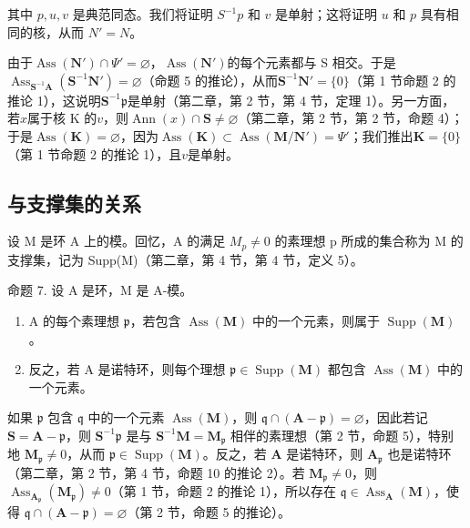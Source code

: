 其中 \(p, u, v\) 是典范同态。我们将证明 \(S^{-1}p\) 和 \(v\) 是单射；这将证明 \(u\) 和 \(p\) 具有相同的核，从而 \(N' = N\)。

由于\(\operatorname{Ass}(\mathbf{N}') \cap \Psi' = \varnothing\)，\(\operatorname{Ass}(\mathbf{N}')\)的每个元素都与 S 相交。于是\(\operatorname{Ass}_{\mathbf{S}^{-1}\mathbf{A}}(\mathbf{S}^{-1}\mathbf{N}') = \varnothing\)（命题 5 的推论），从而\(\mathbf{S}^{-1}\mathbf{N}' = \{0\}\)（第 1 节命题 2 的推论 1），这说明\(\mathbf{S}^{-1}\mathfrak{p}\)是单射（第二章，第 2 节，第 4 节，定理 1）。另一方面，若\(x\)属于核 K 的\(v\)，则\(\operatorname{Ann}(x) \cap \mathbf{S} \neq \varnothing\)（第二章，第 2 节，第 2 节，命题 4）；于是\(\operatorname{Ass}(\mathbf{K}) = \varnothing\)，因为\(\operatorname{Ass}(\mathbf{K}) \subset \operatorname{Ass}(\mathbf{M}/\mathbf{N}') = \Psi'\)；我们推出\(\mathbf{K} = \{0\}\)（第 1 节命题 2 的推论 1），且\(v\)是单射。

\subsection{与支撑集的关系}

设 M 是环 A 上的模。回忆，A 的满足 \(M_{p} \neq 0\) 的素理想 p 所成的集合称为 M 的支撑集，记为 Supp(M)（第二章，第 4 节，第 4 节，定义 5）。

命题 7. 设 A 是环，M 是 A-模。

\begin{enumerate}
\def\labelenumi{(\roman{enumi})}
\item
A 的每个素理想 \(\mathfrak{p}\)，若包含 \(\operatorname{Ass}(\mathbf{M})\) 中的一个元素，则属于 \(\operatorname{Supp}(\mathbf{M})\)。
\item
反之，若 A 是诺特环，则每个理想 \(\mathfrak{p} \in \operatorname{Supp}(\mathbf{M})\) 都包含 \(\operatorname{Ass}(\mathbf{M})\) 中的一个元素。
\end{enumerate}

如果 \(\mathfrak{p}\) 包含 \(\mathfrak{q}\) 中的一个元素 \(\operatorname{Ass}(\mathbf{M})\)，则 \(\mathfrak{q} \cap (\mathbf{A} - \mathfrak{p}) = \varnothing\)，因此若记 \(\mathbf{S} = \mathbf{A} - \mathfrak{p}\)，则 \(\mathbf{S}^{-1}\mathfrak{p}\) 是与 \(\mathbf{S}^{-1}\mathbf{M} = \mathbf{M}_{\mathfrak{p}}\) 相伴的素理想（第 2 节，命题 5），特别地 \(\mathbf{M}_{\mathfrak{p}} \neq 0\)，从而 \(\mathfrak{p} \in \operatorname{Supp}(\mathbf{M})\)。反之，若 \(\mathbf{A}\) 是诺特环，则 \(\mathbf{A}_{\mathfrak{p}}\) 也是诺特环（第二章，第 2 节，第 4 节，命题 10 的推论 2）。若 \(\mathbf{M}_{\mathfrak{p}} \neq 0\)，则 \(\operatorname{Ass}_{\mathbf{A}_{\mathfrak{p}}}(\mathbf{M}_{\mathfrak{p}}) \neq 0\)（第 1 节，命题 2 的推论 1），所以存在 \(\mathfrak{q} \in \operatorname{Ass}_{\mathbf{A}}(\mathbf{M})\)，使得 \(\mathfrak{q} \cap (\mathbf{A} - \mathfrak{p}) = \varnothing\)（第 2 节，命题 5 的推论）。

